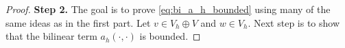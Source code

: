 \begin{proof}
         \textbf{Step 2.} The goal is to prove \eqref{eq:bi_a_h_bounded} using many of the same ideas as in the first part. Let $v \in V_{h} \oplus V $ and $w \in V_{h}$. Next step is to show that the bilinear term $ a_{h}( \cdot ,\cdot ) $ is bounded.

\end{proof}
